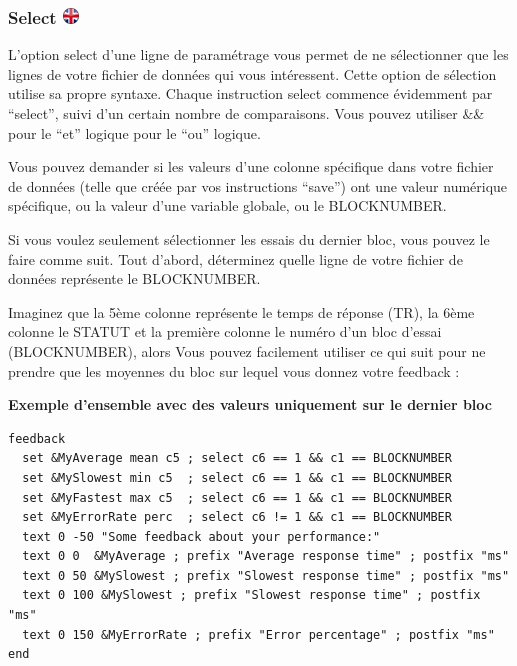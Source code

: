 \documentclass[
]{book}
\begin{document}
\hypertarget{select}{%
\subsubsection[Select ]{\texorpdfstring{Select \href{https://www.psytoolkit.org/doc3.1.0/feedback.html\#_select}{\protect\includegraphics{img/ukflag.png}}}{Select }}\label{select}}

L'option select d'une ligne de paramétrage vous permet de ne sélectionner que les lignes de votre fichier de données qui vous intéressent. Cette option de sélection utilise sa propre syntaxe. Chaque instruction select commence évidemment par ``select'', suivi d'un certain nombre de comparaisons. Vous pouvez utiliser \&\& pour le ``et'' logique \textbar\textbar{} pour le ``ou'' logique.

Vous pouvez demander si les valeurs d'une colonne spécifique dans votre fichier de données (telle que créée par vos instructions ``save'') ont une valeur numérique spécifique, ou la valeur d'une variable globale, ou le BLOCKNUMBER.

Si vous voulez seulement sélectionner les essais du dernier bloc, vous pouvez le faire comme suit. Tout d'abord, déterminez quelle ligne de votre fichier de données représente le BLOCKNUMBER.

Imaginez que la 5ème colonne représente le temps de réponse (TR), la 6ème colonne le STATUT et la première colonne le numéro d'un bloc d'essai (BLOCKNUMBER), alors Vous pouvez facilement utiliser ce qui suit pour ne prendre que les moyennes du bloc sur lequel vous donnez votre feedback :

\textbf{Exemple d'ensemble avec des valeurs uniquement sur le dernier bloc}

\begin{verbatim}
feedback
  set &MyAverage mean c5 ; select c6 == 1 && c1 == BLOCKNUMBER
  set &MySlowest min c5  ; select c6 == 1 && c1 == BLOCKNUMBER
  set &MyFastest max c5  ; select c6 == 1 && c1 == BLOCKNUMBER
  set &MyErrorRate perc  ; select c6 != 1 && c1 == BLOCKNUMBER
  text 0 -50 "Some feedback about your performance:"
  text 0 0  &MyAverage ; prefix "Average response time" ; postfix "ms"
  text 0 50 &MySlowest ; prefix "Slowest response time" ; postfix "ms"
  text 0 100 &MySlowest ; prefix "Slowest response time" ; postfix "ms"
  text 0 150 &MyErrorRate ; prefix "Error percentage" ; postfix "ms"
end
\end{verbatim}
\end{document}
